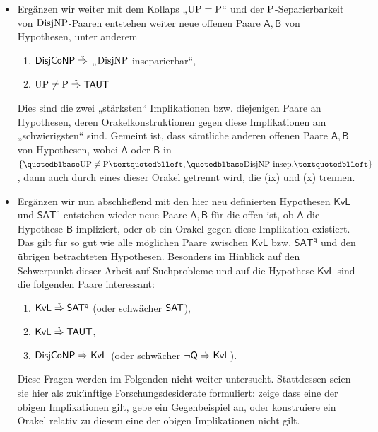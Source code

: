 \begin{itemize}[parsep=0pt,listparindent=\parindent,itemsep=5pt plus 1pt minus 1pt,midpenalty=0]
    \item Ergänzen wir weiter mit dem Kollaps „$\UP=\P$“ und der $\P$-Separierbarkeit von $\DisjNP$-Paaren entstehen weiter neue offenen Paare $\mathsf{A,B}$ von Hypothesen, unter anderem
        \begin{enumerate}[noitemsep,resume,label=(\roman*),beginpenalty=0]
            \item $\hDisjCoNP\stackrel{\smash{\text{\raisebox{-1pt}{\tiny ?}}}}{\Rightarrow}$ „$\DisjNP$ inseparierbar“,
            \item $\UP\neq\P\stackrel{\smash{\text{\raisebox{-1pt}{\tiny ?}}}}{\Rightarrow} \hTAUT$
        \end{enumerate}
        Dies sind die zwei „stärksten“ Implikationen bzw. diejenigen Paare an Hypothesen, deren Orakelkonstruktionen gegen diese Implikationen am „schwierigsten“ sind. Gemeint ist, dass sämtliche anderen offenen Paare $\mathsf{A,B}$ von Hypothesen, wobei $\mathsf{A}$ oder $\mathsf{B}$ in $\{„\UP\neq\P“, „\DisjNP\text{ insep.}“\}$, dann auch durch eines dieser Orakel getrennt wird, die (ix) und (x) trennen.

    \item Ergänzen wir nun abschließend mit den hier neu definierten Hypothesen $\mathsf{KvL}$ und $\mathsf{SAT^{q}}$ entstehen wieder neue Paare $\mathsf{A,B}$ für die offen ist, ob $\mathsf A$ die Hypothese $\mathsf B$ impliziert, oder ob ein Orakel gegen diese Implikation existiert. Das gilt für so gut wie alle möglichen Paare zwischen $\mathsf{KvL}$ bzw. $\mathsf{SAT^{q}}$ und den übrigen betrachteten Hypothesen. 
        Besonders im Hinblick auf den Schwerpunkt dieser Arbeit auf Suchprobleme und auf die Hypothese $\mathsf{KvL}$ sind die folgenden Paare interessant:
        \begin{enumerate}[noitemsep,resume,label=(\roman*)]
            \item $\mathsf{KvL}\stackrel{\smash{\text{\raisebox{-1pt}{\tiny ?}}}}{\Rightarrow}\mathsf{SAT^{q}}$ (oder schwächer $\hSAT$),
            \item $\mathsf{KvL}\stackrel{\smash{\text{\raisebox{-1pt}{\tiny ?}}}}{\Rightarrow}\hTAUT$,
            \item $\hDisjCoNP\stackrel{\smash{\text{\raisebox{-1pt}{\tiny ?}}}}{\Rightarrow}\mathsf{KvL}$ (oder schwächer $\neg\hQ\stackrel{\smash{\text{\raisebox{-1pt}{\tiny ?}}}}{\Rightarrow}\mathsf{KvL}$).
        \end{enumerate}
        Diese Fragen werden im Folgenden nicht weiter untersucht. Stattdessen seien sie hier als zukünftige Forschungsdesiderate formuliert: zeige dass eine der obigen Implikationen gilt, gebe ein Gegenbeispiel an, oder konstruiere ein Orakel relativ zu diesem eine der obigen Implikationen nicht gilt.


\end{itemize}
